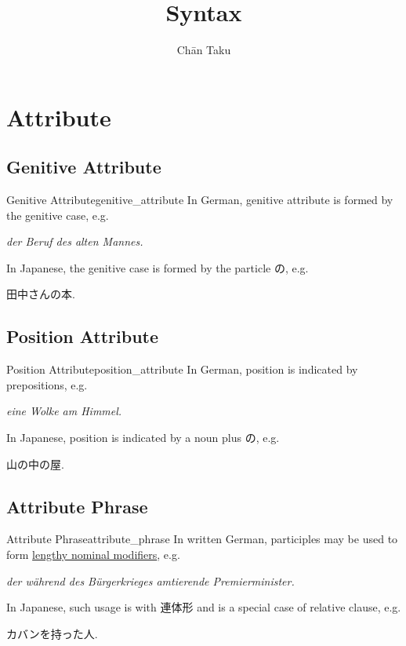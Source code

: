 \documentclass{article}
\title{Syntax}
\author{Ch\=an Taku}
\begin{document}
\maketitle

% 
% 

\section{Attribute}

\subsection{Genitive Attribute}

\begin{example}{Genitive Attribute}{genitive_attribute}
    In German, genitive attribute is formed by the genitive case, e.g.
    \begin{center}
        \textit{der Beruf des alten Mannes.}
    \end{center}
    In Japanese, the genitive case is formed by the particle の, e.g.
    \begin{center}
        田中さんの本.
    \end{center}
\end{example}

\subsection{Position Attribute}

\begin{example}{Position Attribute}{position_attribute}
    In German, position is indicated by prepositions, e.g.
    \begin{center}
        \textit{eine Wolke am Himmel.}
    \end{center}
    In Japanese, position is indicated by a noun plus の, e.g.
    \begin{center}
        山の中の屋.
    \end{center}
\end{example}

\subsection{Attribute Phrase}

\begin{example}{Attribute Phrase}{attribute_phrase}
    In written German, participles may be used to form \href{https://en.wikipedia.org/wiki/German_grammar#Extended_attribute_phrase}{lengthy nominal modifiers}, e.g.
    \begin{center}
        \textit{der während des Bürgerkrieges amtierende Premierminister.}
    \end{center}
    In Japanese, such usage is with 連体形 and is a special case of relative clause, e.g.
    \begin{center}
        カバンを持った人.
    \end{center}
\end{example}
\end{document}
